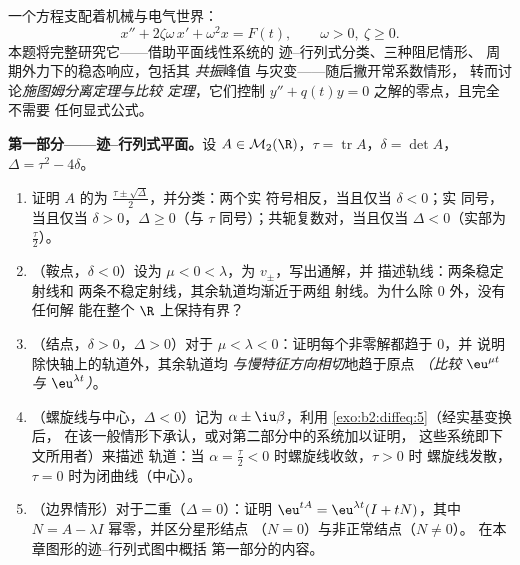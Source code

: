 \begin{problem}\label{pb:b2:diffeq:1}
一个方程支配着机械与电气世界：
\[
x'' + 2\zeta\omega\,x' + \omega^2 x = F(t),
\qquad \omega > 0,\ \zeta \geq 0 .
\]
本题将完整研究它——借助平面线性系统的
迹--行列式分类、三种阻尼情形、
周期外力下的稳态响应，包括其
\emph{共振}峰值
与灾变——随后撇开常系数情形，
转而讨论\emph{施图姆分离定理与比较
定理}，它们控制
$y'' + q(t)y = 0$ 之解的零点，且完全不需要
任何显式公式。

\medskip
\noindent\textbf{第一部分——迹--行列式平面。}设
$A \in \mathcal M_2(\R)$，$\tau = \operatorname{tr}A$，$\delta
= \det A$，$\Delta = \tau^2 - 4\delta$。
\begin{enumerate}
  \item 证明 $A$ 的为
        $\frac{\tau\pm\sqrt\Delta}{2}$，并分类：两个实
        符号相反，当且仅当 $\delta < 0$；实
        同号，当且仅当 $\delta > 0$，$\Delta
        \geq 0$（与 $\tau$ 同号）；共轭复数对，当且仅当
        $\Delta < 0$（实部为 $\frac\tau2$）。
  \item （鞍点，$\delta < 0$）设为 $\mu < 0 <
        \lambda$，为 $v_\pm$，写出通解，并
        描述轨线：两条稳定射线和
        两条不稳定射线，其余轨道均渐近于两组
        射线。为什么除 $0$ 外，没有任何解
        能在整个 $\R$ 上保持有界？
  \item （结点，$\delta > 0$，$\Delta > 0$）对于 $\mu < \lambda
        < 0$：证明每个非零解都趋于 $0$，并
        说明除快轴上的轨道外，其余轨道均
        \emph{与慢特征方向相切}地趋于原点
        \emph{（比较 $\eu^{\mu t}$ 与 $\eu^{\lambda t}$）}。
  \item （螺旋线与中心，$\Delta < 0$）记为
        $\alpha \pm \iu\beta$，利用
        \cref{exo:b2:diffeq:5}（经实基变换后，
        在该一般情形下承认，或对第二部分中的系统加以证明，
        这些系统即下文所用者）来描述
        轨道：当 $\alpha =
        \frac\tau2 < 0$ 时螺旋线收敛，$\tau > 0$ 时
        螺旋线发散，$\tau = 0$ 时为闭曲线（中心）。
  \item （边界情形）对于二重（$\Delta =
        0$）：证明 $\eu^{tA} = \eu^{\lambda t}(I + tN)$，其中 $N
        = A - \lambda I$ 幂零，并区分星形结点
        （$N = 0$）与非正常结点（$N \neq 0$）。
        在本章图形的迹--行列式图中概括
        第一部分的内容。
\end{enumerate}


\end{problem}
